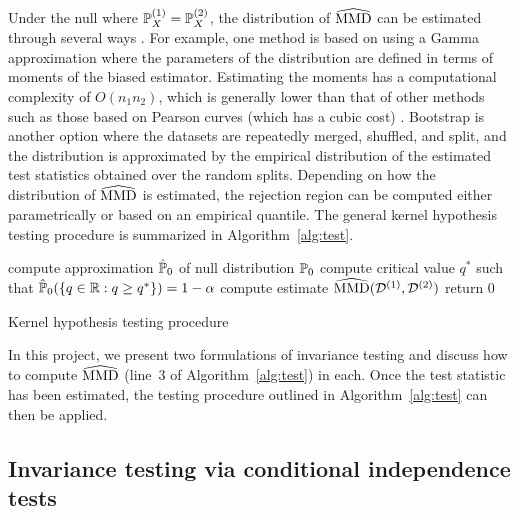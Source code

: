 Under the null where $\P_X^{(1)}=\P_X^{(2)}$, the distribution of $\hatMMD$ can be estimated through several ways \parencite{Gretton:2009}. For example, one method is based on using a Gamma approximation where the parameters of the distribution are defined in terms of moments of the biased estimator. Estimating the moments has a computational complexity of $O(n_1n_2)$, which is generally lower than that of other methods such as those based on Pearson curves (which has a cubic cost) \parencite{Gretton:2009}. Bootstrap is another option where the datasets are repeatedly merged, shuffled, and split, and the distribution is approximated by the empirical distribution of the estimated test statistics obtained over the random splits. Depending on how the distribution of $\hatMMD$ is estimated, the rejection region can be computed either parametrically or based on an empirical quantile. The general kernel hypothesis testing procedure is summarized in Algorithm~\ref{alg:test}.
\\

\begin{algorithm}[H]
\SetAlgoLined
{}
\BlankLine
compute approximation $\hat{\P}_0$ of null distribution $\P_0$\;
compute critical value $q^*$ such that $\hat{\P}_0(\{q\in\bbR:q\geq q^*\})=1-\alpha$\;
compute estimate $\hatMMD(\calD^{(1)},\calD^{(2)})$\;
return 0\;
\caption{Kernel hypothesis testing procedure}
\label{alg:test}
\end{algorithm}
\vspace{1em}

In this project, we present two formulations of invariance testing and discuss how to compute $\hatMMD$ (line~3 of Algorithm~\ref{alg:test}) in each. Once the test statistic has been estimated, the testing procedure outlined in Algorithm~\ref{alg:test} can then be applied.


\subsection{Invariance testing via conditional independence tests} \label{sec:condind}

